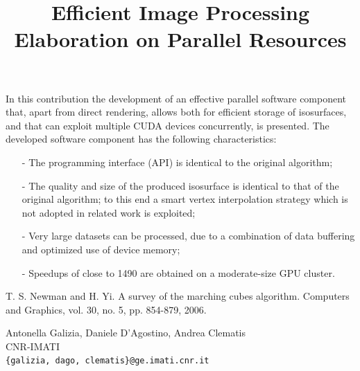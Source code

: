 \documentclass[article, A4, 11pt]{llncs}%
\begin{document}
In this contribution the development of an effective parallel software component that, apart from direct rendering, allows both for efficient storage of isosurfaces, and that can exploit multiple CUDA devices concurrently, is presented. 
The developed software component has the following characteristics:
\begin{itemize}
\item[-] The programming interface (API) is identical to the original algorithm;
\item[-] The quality and size of the produced isosurface is identical to that of the original algorithm; to this end a smart vertex interpolation strategy which is not adopted in related work is exploited;
\item[-] Very large datasets can be processed, due to a combination of data buffering and optimized use of device memory;
\item[-] Speedups of close to 1490 are obtained on a moderate-size GPU cluster.
\end{itemize}


\begin{thebibliography}{10}
{\sc T. S. Newman and H. Yi}. {A survey of the marching cubes algorithm}. Computers and Graphics, vol. 30, no. 5, pp. 854-879, 2006.
\end{thebibliography} %

\title{Efficient Image Processing Elaboration on Parallel Resources}
 \author{} \institute{}
\maketitle
\begin{center}
{\large Antonella Galizia, Daniele D'Agostino, Andrea Clematis}\\
CNR-IMATI\\
{\tt \{galizia, dago, clematis\}@ge.imati.cnr.it}
\end{center}
\end{document}
